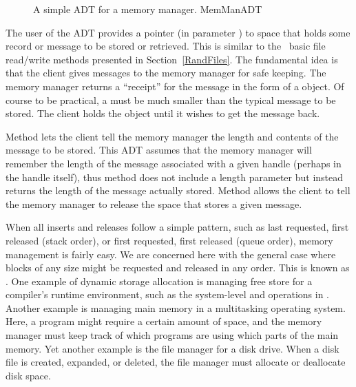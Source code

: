 \begin{figure}

\vspace{-\bigskipamount}
{A simple ADT for a memory manager.}
{MemManADT}
\end{figure}

The user of the  ADT provides a pointer
(in parameter ) to space that
holds some record or message to be stored or retrieved.
This is similar to the \Lang\ basic file read/write methods presented
in Section~\ref{RandFiles}.
The fundamental idea is that the client gives messages to the memory
manager for safe keeping.
The memory manager returns a ``receipt'' for the message in the form
of a  object.
Of course to be practical, a  must be much smaller
than the typical message to be stored.
The client holds the  object until it wishes to get the
message back.

Method  lets the client tell the memory manager the
length and contents of the message to be stored.
This ADT assumes that the memory manager will remember the length of
the message associated with a given handle (perhaps in the handle
itself), thus method  
does not include a length parameter but instead returns the length of 
the message actually stored.
Method  allows the client to tell the memory manager to
release the space that stores a given message.

When all inserts and releases follow a simple pattern, such as last
requested, first released (stack order), or first requested, first
released (queue order), memory management is fairly easy.
We are concerned here with the general case where blocks
of any size might be requested and released in any order.
This is known as .
One example of dynamic storage allocation is managing free store for a
compiler's runtime environment, such as the system-level
{and  operations}{}
 in \Lang.
Another example is managing main memory in a multitasking operating
system.
Here, a program might require a certain amount of space, and the
memory manager must keep track of which programs are using which parts
of the main memory.
Yet another example is the file manager for a
disk drive.
When a disk file is created, expanded, or deleted, the file manager
must allocate or deallocate disk space.

